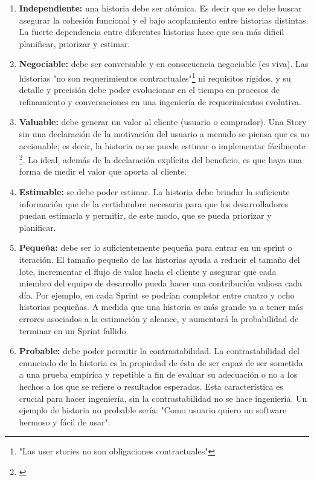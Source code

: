 \begin{enumerate}

\item \textbf{Independiente:} una historia debe ser atómica. Es decir que se debe buscar asegurar la cohesión funcional y el bajo acoplamiento entre historias distintas. La fuerte dependencia entre diferentes historias hace que sea más dificil planificar, priorizar y estimar.

\item \textbf{Negociable:} debe ser conversable y en consecuencia negociable (es viva). Las historias "no son requerimientos contractuales"\footnote{"Las user stories no son obligaciones contractuales"\cite{Cohn-2004}} ni requisitos rígidos, y su detalle y precisión debe poder evolucionar en el tiempo en procesos de refinamiento y conversaciones en una ingeniería de requerimientos evolutiva.

\item \textbf{Valuable:} debe generar un valor al cliente (usuario o comprador). Una Story sin una declaración de la motivación del usuario a menudo se piensa que es no accionable; es decir, la historia no se puede estimar o implementar fácilmente \footnote{\cite{Scott-Bellware-2008}}. Lo ideal, además de la declaración explícita del beneficio, es que haya una forma de medir el valor que aporta al cliente.

\item \textbf{Estimable:} se debe poder estimar. La historia debe brindar la suficiente información que de la certidumbre necesaria para que los desarrolladores puedan estimarla y permitir, de este modo, que se pueda priorizar y planificar. 

\item \textbf{Pequeña:} debe ser lo suficientemente pequeña para entrar en un sprint o iteración. El tamaño pequeño de las historias ayuda a reducir el tamaño del lote, incrementar el flujo de valor hacia el cliente y asegurar que cada miembro del equipo de desarrollo pueda hacer una contribución valiosa cada día. Por ejemplo, en cada Sprint se podrían completar entre cuatro y ocho historias pequeñas. A medida que una historia es más grande va a tener más errores asociados a la estimación y alcance, y aumentará la probabilidad de terminar en un Sprint fallido.

\item \textbf{Probable:} debe poder permitir la contrastabilidad. La contrastabilidad del enunciado de la historia es la propiedad de ésta de ser capaz de ser sometida a una prueba empírica y repetible a fin de evaluar su adecuación o no a los hechos a los que se refiere o resultados esperados. Esta característica es crucial para hacer ingeniería, sin la contrastabilidad no se hace ingeniería. Un ejemplo de historia no probable sería: "Como usuario quiero un software hermoso y fácil de usar".

\end{enumerate}

